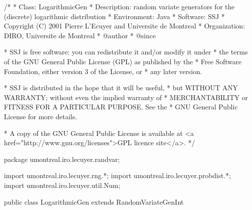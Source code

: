 \begin{code}
\begin{hide}
/*
 * Class:        LogarithmicGen
 * Description:  random variate generators for the (discrete) logarithmic distribution
 * Environment:  Java
 * Software:     SSJ 
 * Copyright (C) 2001  Pierre L'Ecuyer and Universite de Montreal
 * Organization: DIRO, Universite de Montreal
 * @author       
 * @since

 * SSJ is free software: you can redistribute it and/or modify it under
 * the terms of the GNU General Public License (GPL) as published by the
 * Free Software Foundation, either version 3 of the License, or
 * any later version.

 * SSJ is distributed in the hope that it will be useful,
 * but WITHOUT ANY WARRANTY; without even the implied warranty of
 * MERCHANTABILITY or FITNESS FOR A PARTICULAR PURPOSE.  See the
 * GNU General Public License for more details.

 * A copy of the GNU General Public License is available at
   <a href="http://www.gnu.org/licenses">GPL licence site</a>.
 */
\end{hide}
package umontreal.iro.lecuyer.randvar;\begin{hide}
import umontreal.iro.lecuyer.rng.*;
import umontreal.iro.lecuyer.probdist.*;
import umontreal.iro.lecuyer.util.Num;
\end{hide}

public class LogarithmicGen extends RandomVariateGenInt \begin{hide} {
   private static final double default_theta_limit = 0.96;

   private double theta_limit = default_theta_limit;
   private double theta;
   private double t;      // = log (1.0-theta).
   private double h;      // = -theta/log (1.0-theta).
\end{hide}
\end{code}

